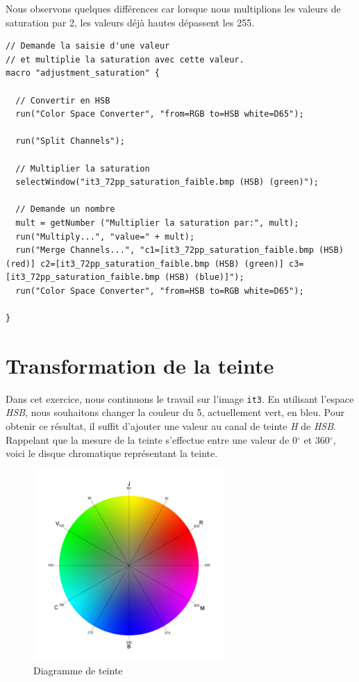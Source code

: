 \documentclass[a4paper,11pt]{article}
\begin{document}
Nous observons quelques différences car lorsque nous multiplions les 
valeurs de saturation par 2, les valeurs déjà hautes dépassent les 255.\\

\begin{lstlisting}[caption=adjustment\_saturation.ijm]
// Demande la saisie d'une valeur
// et multiplie la saturation avec cette valeur.
macro "adjustment_saturation" {

  // Convertir en HSB
  run("Color Space Converter", "from=RGB to=HSB white=D65");

  run("Split Channels");

  // Multiplier la saturation
  selectWindow("it3_72pp_saturation_faible.bmp (HSB) (green)");
  
  // Demande un nombre 
  mult = getNumber ("Multiplier la saturation par:", mult);
  run("Multiply...", "value=" + mult);
  run("Merge Channels...", "c1=[it3_72pp_saturation_faible.bmp (HSB) (red)] c2=[it3_72pp_saturation_faible.bmp (HSB) (green)] c3=[it3_72pp_saturation_faible.bmp (HSB) (blue)]");
  run("Color Space Converter", "from=HSB to=RGB white=D65");

}

\end{lstlisting}

\newpage

\section{Transformation de la teinte}

Dans cet exercice, nous continuons le travail sur l'image \texttt{it3}. 
En utilisant l'espace \textit{HSB}, nous souhaitons changer la couleur 
du 5, actuellement vert, en bleu. Pour obtenir ce résultat, il suffit 
d'ajouter une valeur au canal de teinte \textit{H} de \textit{HSB}. 
Rappelant que la mesure de la teinte s'effectue entre une valeur de 
0$^{\circ}$ et 360$^{\circ}$, voici le disque chromatique représentant la teinte.\\

\begin{figure}[H]
  \begin{center}
    \includegraphics[width=275px]{images/disque_chr.png}
    \caption{Diagramme de teinte}
  \end{center}
\end{figure}
\end{document}
